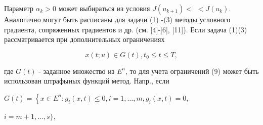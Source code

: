 \documentclass[10pt]{article}
\begin{document}
Параметр $\alpha_{k}>0$ может выбираться из условия $J\left(u_{k+1}\right)<$ $<J\left(u_{k}\right)$. Аналогично могут быть расписаны для задачи (1) -(3) методы условного градиента, сопряженных градиентов и др. (см. [4]-[6], [11]). Если задача (1)(3) рассматривается при дополнительных ограничениях



\[

x(t ; u) \in G(t), t_{0} \leqslant t \leqslant T,

\]



где $G(t)$ - заданное множество из $E^{n}$, то для учета ограничений (9) может быть использован штрафыных функций метод. Напр., если



$G(t)=\left\{x \in E^{n}: g_{i}(x, t) \leqslant 0, i=1, \ldots, m, g_{i}(x, t)=0\right.$,

$i=m+1, \ldots, s\}$,
\end{document}
